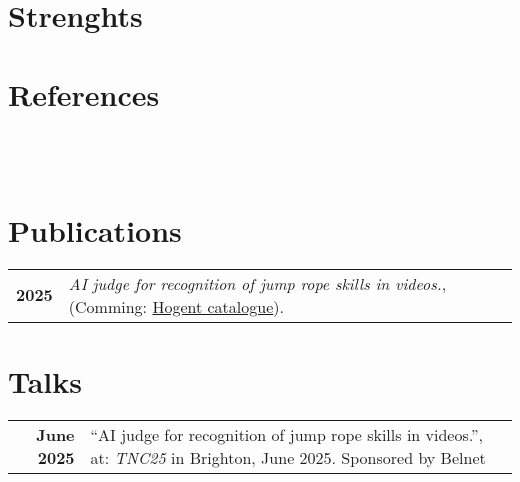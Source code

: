\documentclass[grey]{hipstercv}
\newlength{\rightcolwidth}
\begin{document}
\begin{paracol}{2}
\begin{minipage}[t]{0.30\rightcolwidth}
\section*{Strenghts}
\end{minipage}\hfill

\vspace{1em}

\begin{minipage}[t]{0.30\rightcolwidth}
\section*{References}
 \\
 \\
\end{minipage}
\begin{minipage}[t]{0.31\rightcolwidth}
\section*{Publications}
\begin{tabular}{>{\footnotesize\bfseries}r >{\footnotesize}p{}}
    2025 & \emph{AI judge for recognition of jump rope
skills in videos.}, (Comming: \href{https://www.hogent.be/student/bibliotheken/}{Hogent catalogue}). \\
\end{tabular}
\end{minipage}
\begin{minipage}[t]{0.31\rightcolwidth}
\section*{Talks}
\begin{tabular}{>{\footnotesize\bfseries}r >{\footnotesize}p{}}
    June 2025 & ``AI judge for recognition of jump rope
skills in videos.'', at: \emph{TNC25} in Brighton, June 2025. Sponsored by Belnet
\end{tabular}
\end{minipage}\hfill


\begin{minipage}[t]{0.48\rightcolwidth}
\end{minipage}








\end{paracol}
\end{document}
